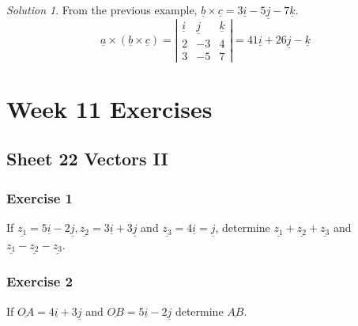 \documentclass[
  english,
  11pt,
  oneside]{book}
\newcommand{\slide}{}
\theoremstyle{definition}
\theoremstyle{definition}
\theoremstyle{definition}
\theoremstyle{definition}
\theoremstyle{remark}
\newtheorem*{solution}{Solution}
\begin{document}
\begin{solution}
From the previous example, \(\underline b \times\underline c = 3\underline i-5\underline j-7\underline k\).
\[
\underline a \times (\underline b \times\underline c) = \left|\begin{array}{ccc}\underline i&\underline j&\underline k\\2&-3&4\\3&-5&7\end{array}\right| = 41\underline i+26\underline j-\underline k
\]
\end{solution}

\begin{slidesonly}

\slide

\hbox{}
\slide

\end{slidesonly}

\chapter*{Week 11 Exercises}\label{week-11-exercises}

\section{Sheet 22 Vectors II}\label{sheet-22-vectors-ii}

\subsection*{Exercise 1}\label{exercise-1-13}

If \(\underline{z_1} = 5\underline{i}-2\underline{j}, \underline{z_2} = 3\underline{i}+3\underline{j}\) and \(\underline{z_3}=4\underline{i}=\underline{j}\), determine \(\underline{z_1}+\underline{z_2}+\underline{z_3}\) and \(\underline{z_1}-\underline{z_2}-\underline{z_3}\).

\slide

\subsection*{Exercise 2}\label{exercise-2-13}

If \(\underline{OA}=4\underline{i}+3\underline{j}\) and \(\underline{OB}=5\underline{i}-2\underline{j}\) determine \(\underline{AB}\).
\end{document}
